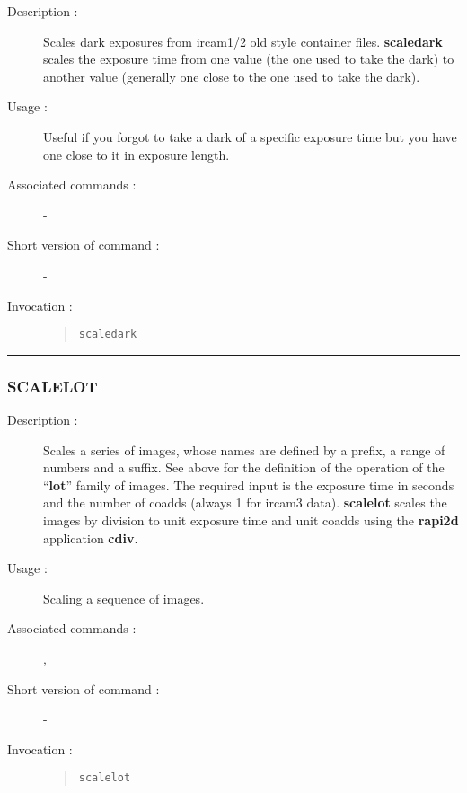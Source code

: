 \begin{description}

\item[Description :] Scales dark exposures from {\sc ircam1/2} old
style container files. {\bf scaledark} scales the exposure time from one
value (the one used to take the dark) to another value (generally one
close to the one used to take the dark).

\item[Usage :] Useful if you forgot to take a dark of a specific exposure 
time but you have one close to it in exposure length.
\item[Associated commands :] -
\item[Short version of command :] -
\item[Invocation :]

\begin{quote}{\tt  scaledark }\end{quote}

\end{description}

\hrule 
\subsubsection*{\label{SCALELOT}SCALELOT}

\begin{description}

\item[Description :] Scales a series of images, whose names are defined by a
prefix, a range of numbers and a suffix. See above for the definition
of the operation of the ``{\bf lot}'' family of images.  The required
input is the exposure time in seconds and the number of coadds (always
1 for {\sc ircam3} data).  {\bf scalelot} scales the images by division
to unit exposure time and unit coadds using the {\bf rapi2d}
application {\bf cdiv}.

\item[Usage :] Scaling a sequence of images.

\item[Associated commands :] {\tt {}}, 
{\tt {}}

\item[Short version of command :] -
\item[Invocation :]

\begin{quote}{\tt  scalelot }\end{quote}

\end{description}

